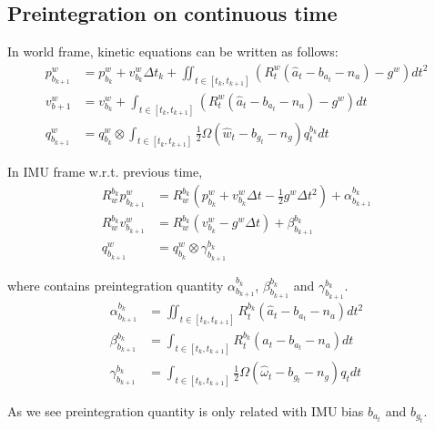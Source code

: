 \subsection{Preintegration on continuous time}
In world frame, kinetic equations can be written as follows:
\begin{equation}
	\begin{split}
		p_{b_{k+1}}^w & = p_{b_k}^w + v_{b_k}^w \Delta t_k +\iint_{t\in [t_k,t_{k+1}]} (R^w_t(\hat{a}_t-b_{a_t}-n_a)-g^w) dt^2 \\
		v_{b+1}^w & = v_{b_k}^w + \int_{t\in [t_k,t_{k+1}]} (R^w_t(\hat{a}_t-b_{a_t}-n_a)-g^w) dt \\
		q_{b_{k+1}}^w & = q_{b_k}^w \otimes \int_{t\in [t_k,t_{k+1}]} \frac{1}{2} \Omega(\hat{w}_t-b_{g_t}-n_g)q_t^{b_k} dt
	\end{split}
\end{equation}
\par In IMU frame w.r.t. previous time,
\begin{equation}
	\begin{split}
		R_w^{b_k}p_{b_{k+1}}^w &= R_w^{b_k}( p_{b_k}^w + v_{b_k}^w\Delta{t} - \frac12g^w\Delta{t}^2) + \alpha_{b_{k+1}}^{b_k} \\
		R_w^{b_k}v_{b_{k+1}}^w &= R_w^{b_k}( v_{b_k}^w - g^w\Delta{t} ) + \beta_{b_{k+1}}^{b_k} \\
		q_{b_{k+1}}^w &= q_{b_k}^w \otimes \gamma_{b_{k+1}}^{b_k}
	\end{split}
\end{equation}
\par where contains preintegration quantity $\alpha_{b_{k+1}}^{b_k}$, $\beta_{b_{k+1}}^{b_k}$ and $\gamma_{b_{k+1}}^{b_k}$.
\begin{equation}
	\begin{split}
		\alpha_{b_{k+1}}^{b_k} &= \iint_{t\in[t_k,t_{k+1}]}R_t^{b_k}(\hat{a}_t-b_{a_t}-n_a)dt^2 \\
		\beta_{b_{k+1}}^{b_k} &= \int_{t\in[t_k,t_{k+1}]}R_t^{b_k}(\hat{a}_t-b_{a_t}-n_a)dt \\
		\gamma_{b_{k+1}}^{b_k} &= \int_{t\in[t_k,t_{k+1}]}\frac12\Omega(\hat{\omega}_t-b_{g_t}-n_g)q_tdt
	\end{split}
\end{equation}
\par As we see preintegration quantity is only related with IMU bias $b_{a_t}$ and $b_{g_t}$.

